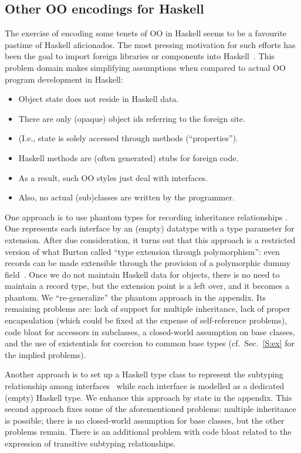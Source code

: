 \subsection{Other OO encodings for Haskell}

The exercise of encoding some tenets of OO in Haskell seems to be a
favourite pastime of Haskell aficionados. The most pressing motivation
for such efforts has been the goal to import foreign libraries or
components into Haskell~\cite{FLMPJ99,SPJ01,PC03}. This problem domain
makes simplifying assumptions when compared to actual OO program
development in Haskell:

\begin{itemize}\noskip
\item Object state does not reside in Haskell data.
\item There are only (opaque) object ids referring to the foreign site.
\item (I.e., state is solely accessed through methods (``properties'').
\item Haskell methods are (often generated) stubs for foreign code.
\item As a result, such OO styles just deal with interfaces.
\item Also, no actual (sub)classes are written by the programmer.
\end{itemize}

One approach is to use phantom types for recording inheritance
relationships \cite{FLMPJ99}. One represents each interface by an
(empty) datatype with a type parameter for extension. After due
consideration, it turns out that this approach is a restricted version
of what Burton called ``type extension through polymorphism'': even
records can be made extensible through the provision of a polymorphic
dummy field~\cite{Burton90}. Once we do not maintain Haskell data for
objects, there is no need to maintain a record type, but the extension
point is a left over, and it becomes a phantom.  We ``re-generalize''
the phantom approach in the appendix. Its remaining problems are: lack
of support for multiple inheritance, lack of proper encapsulation
(which could be fixed at the expense of self-reference problems), code
bloat for accessors in subclasses, a closed-world assumption on base
classes, and the use of existentials for coercion to common base types
(cf.\ Sec.~\ref{S:ex} for the implied problems).

Another approach is to set up a Haskell type class to represent the
subtyping relationship among interfaces~\cite{SPJ01,PC03} while each
interface is modelled as a dedicated (empty) Haskell type. We enhance
this approach by state in the appendix. This second approach fixes
some of the aforementioned problems: multiple inheritance is possible;
there is no closed-world assumption for base classes, but the other
problems remain. There is an additional problem with code bloat
related to the expression of transitive subtyping relationships.


